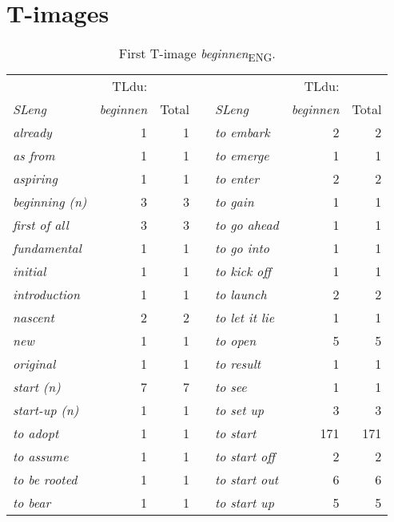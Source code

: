 \appendix
\chapter{T-images}\label{ch:A} 

\begin{table}
\caption{First T-image \textit{beginnen}\textsubscript{ENG}.}
\begin{tabularx}{\textwidth}{>{\itshape}lrrX>{\itshape}lrr}
\lsptoprule
                  & TLdu:               &                &   &                    &  TLdu: & \\
\normalfont SLeng & {\itshape beginnen} & Total          &   & \normalfont  SLeng &  {\itshape beginnen} & Total\\\midrule
 already &  1 &  1 & & to embark &  2 &  2\\
 as from &  1 &  1                           & & to emerge &  1 &  1\\
 aspiring &  1 &  1                          & & to enter &  2 &  2\\
 beginning (n) &  3 &  3                     & & to gain &  1 &  1\\
 first of all &  3 &  3                      & & to go ahead &  1 &  1\\
 fundamental &  1 &  1                       & & to go into &  1 &  1\\
 initial &  1 &  1                           & & to kick off &  1 &  1\\
 introduction &  1 &  1                      & & to launch &  2 &  2\\
 nascent &  2 &  2                           & & to let it lie &  1 &  1\\
 new &  1 &  1                               & & to open &  5 &  5\\
 original &  1 &  1                          & & to result &  1 &  1\\
 start (n) &  7 &  7                         & & to see &  1 &  1\\
 start-up (n) &  1 &  1                      & & to set up &  3 &  3\\
 to adopt &  1 &  1                          & & to start &  171 &  171\\
 to assume &  1 &  1                         & & to start off &  2 &  2\\
 to be rooted &  1 &  1                      & & to start out &  6 &  6\\
 to bear &  1 &  1                           & & to start up &  5 &  5\\

\end{tabularx}
\end{table}
